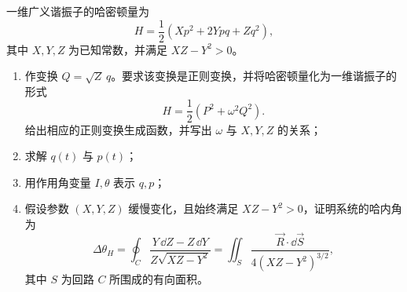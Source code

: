 \begin{question}[一维广义谐振子]
一维广义谐振子的哈密顿量为
\[
  H=\frac12\left(Xp^2+2Ypq+Zq^2\right),
\]
其中 $X,Y,Z$ 为已知常数，并满足 $XZ-Y^2>0$。
\begin{enumerate}
  \item 作变换 $Q=\sqrt{Z}\,q$。要求该变换是正则变换，并将哈密顿量化为一维谐振子的形式
  \[
    H=\frac12\left(P^2+\omega^2Q^2\right).
  \]
  给出相应的正则变换生成函数，并写出 $\omega$ 与 $X,Y,Z$ 的关系；
  \item 求解 $q(t)$ 与 $p(t)$；
  \item 用作用角变量 $I,\theta$ 表示 $q,p$；
  \item 假设参数 $(X,Y,Z)$ 缓慢变化，且始终满足 $XZ-Y^2>0$，证明系统的哈内角为
  \[
    \Delta\theta_H
    =\oint_C\frac{Y\,\dd Z-Z\,\dd Y}{Z\sqrt{XZ-Y^2}}
    =\iint_S\frac{\vec R\cdot\dd\vec S}{4(XZ-Y^2)^{3/2}},
  \]
  其中 $S$ 为回路 $C$ 所围成的有向面积。
\end{enumerate}


\end{question}
